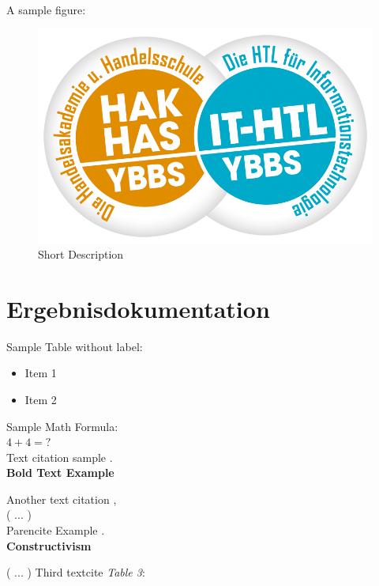 A sample figure: \\

\begin{figure}[H]
	\centering
	\includegraphics[width=0.5\linewidth]{images/SZ-Ybbs-Logo}
	\caption[Short Description]{Short Description}
	\label{fig:sz-ybbs-logo}
\end{figure}

\chapter{Ergebnisdokumentation}

Sample Table without label:

\begin{itemize}
	\item 	Item 1
	\item 	Item 2
\end{itemize}

Sample Math Formula: \\

$4 + 4 = ?$ \\


Text citation sample
\textcite{Vigna}. \\


\textbf{Bold Text Example}

Another text citation \textcite{OWASP},  \\

( ...  ) \\

Parencite Example \parencite{embroker}. \\

\textbf{Constructivism}

( ...  ) Third textcite \textcite{DeciRyan} \emph{Table 3}:

